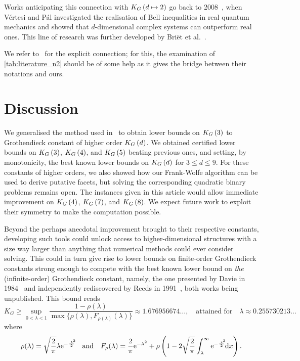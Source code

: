 \documentclass[10pt,aps,notitlepage,onecolumn,pra,superscriptaddress]{revtex4-1}
\renewcommand{\leq}{\leqslant}
\renewcommand{\geq}{\geqslant}
\newcommand{\bd}{\mathrm{d}}
\newcommand{\be}{\mathrm{e}}
\newcommand\KG[2]{K_G\left({#1}\ifx#2\empty\else\mapsto\fi{#2}\right)}
\begin{document}
Works anticipating this connection with $\KG{d}{2}$ go back to 2008~\cite{PV08,VP08}, when Vértesi and Pál investigated the realisation of Bell inequalities in real quantum mechanics and showed that $d$-dimensional complex systems can outperform real ones.
This line of research was further developed by Briët et al.~\cite{BBT11}.

We refer to~\cite{VP08} for the explicit connection; for this, the examination of \cref{tab:literature_n2} should be of some help as it gives the bridge between their notations and ours.

\section{Discussion}
\label{sec:discussion}

We generalised the method used in~\cite{DIB+23} to obtain lower bounds on $\KG{3}{}$ to Grothendieck constant of higher order $\KG{d}{}$.
We obtained certified lower bounds on $\KG{3}{}$, $\KG{4}{}$, and $\KG{5}{}$ beating previous ones, and setting, by monotonicity, the best known lower bounds on $\KG{d}{}$ for $3\leq d\leq9$.
For these constants of higher orders, we also showed how our Frank-Wolfe algorithm can be used to derive putative facets, but solving the corresponding quadratic binary problems remains open.
The instances given in this article would allow immediate improvement on $\KG{4}{}$, $\KG{7}{}$, and $\KG{8}{}$.
We expect future work to exploit their symmetry to make the computation possible.

Beyond the perhaps anecdotal improvement brought to their respective constants, developing such tools could unlock access to higher-dimensional structures with a size way larger than anything that numerical methods could ever consider solving.
This could in turn give rise to lower bounds on finite-order Grothendieck constants strong enough to compete with the best known lower bound on \emph{the} (infinite-order) Grothendieck constant, namely, the one presented by Davie in 1984~\cite{Dav84} and independently rediscovered by Reeds in 1991~\cite{Ree91}, both works being unpublished.
This bound reads
\begin{equation}
  K_G\geq\sup_{0<\lambda<1}\frac{1-\rho(\lambda)}{\max\{\rho(\lambda),F_{\rho(\lambda)}(\lambda)\}}\approx1.676956674\ldots,
  \quad\text{attained for}\quad
  \lambda\approx0.255730213\ldots
  \label{eqn:infinite}
\end{equation}
where
\begin{equation}
  \rho(\lambda)=\sqrt{\frac{2}{\pi}}\lambda\be^{-\frac{\hphantom{^2\!\!}\lambda^2\!\!}{2}}
  \quad\text{and}\quad
  F_\rho(\lambda)=\frac{2}{\pi}\be^{-\lambda^2}+\rho\left(1-2\sqrt{\frac{2}{\pi}}\int_\lambda^\infty\be^{-\frac{\hphantom{^2\!\!}x^2\!\!}{2}}\bd x\right).
\end{equation}
\end{document}
